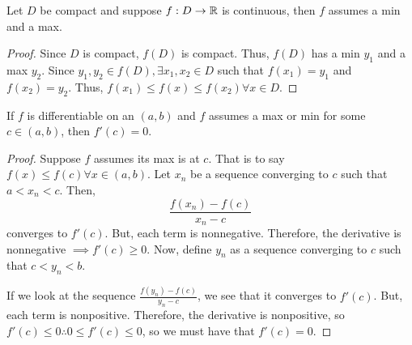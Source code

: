 \begin{theorem}{}{}
    Let $D$ be compact and suppose $f: D \to \mathbb{R}$ is continuous, then $f$ assumes a min and a max.
\end{theorem}
\begin{proof}
    Since $D$ is compact, $f(D)$ is compact. Thus, $f(D)$ has a min $y_1$ and a max $y_2$. Since $y_1, y_2 \in f(D), \exists x_1, x_2 \in D$ such that $f(x_1) = y_1$ and $f(x_2) = y_2$. Thus, $f(x_1) \leq f(x) \leq f(x_2) \forall x \in D$.
\end{proof}

\begin{theorem}{}{}
    If $f$ is differentiable on an $(a, b)$ and $f$ assumes a max or min for some $c \in (a, b)$, then $f'(c) = 0$.
\end{theorem}
\begin{proof}
    Suppose $f$ assumes its max is at $c$. That is to say $f(x) \leq f(c) \forall x \in (a, b)$. Let $x_n$ be a sequence converging to $c$ such that $a < x_n < c$. Then, $$\frac{f(x_n) - f(c)}{x_n - c}$$ converges to $f'(c)$. But, each term is nonnegative. Therefore, the derivative is nonnegative $\implies f'(c) \geq 0$. Now, define $y_n$ as a sequence converging to $c$ such that $c < y_n < b$.

    If we look at the sequence $\frac{f(y_n) - f(c)}{y_n - c}$, we see that it converges to $f'(c)$. But, each term is nonpositive. Therefore, the derivative is nonpositive, so $f'(c) \leq 0 \therefore 0 \leq f'(c) \leq 0$, so we must have that $f'(c) = 0$.
\end{proof}